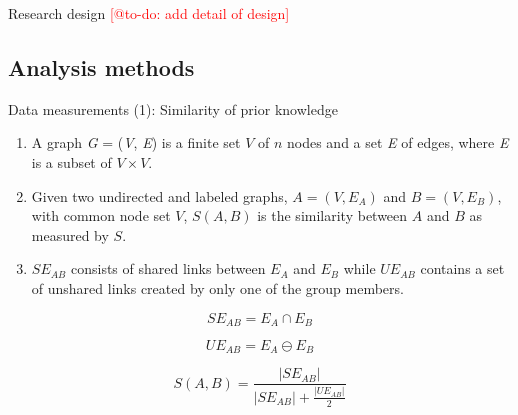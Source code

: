 \begin{frame}{Research design}
\textcolor<1>{red}{[@to-do: add detail of design]} 
\end{frame}


\subsection{Analysis methods}
\begin{frame}[allowframebreaks]{Data measurements (1): Similarity of prior knowledge}
    \begin{enumerate}
        \item A graph \textit{G} = (\textit{V}, \textit{E}) is a finite set $V$ 
        of $n$ nodes and a set \textit{E} of edges, where \textit{E} is a 
        subset of $V \times V$.
        \item Given two undirected and labeled graphs, $A = (V, E_A)$ and 
        $B = (V, E_B)$, with common node set $V$, $S(A, B)$ is the similarity 
        between $A$ and $B$ as measured by $S$. 
        \item $SE_{AB}$ consists of shared links between $E_A$ and $E_B$ 
        while $UE_{AB}$ contains a set of unshared links created by 
        only one of the group members.
    \end{enumerate}
     
    \begin{equation}
      SE_{AB} = E_A \cap E_B \label{eq:1}
    \end{equation}
    
    \begin{equation}
      UE_{AB} = E_A \ominus E_B \label{eq:2}
    \end{equation}
    
    \begin{equation}
      S(A, B) = \frac{|SE_{AB}|}{{|SE_{AB}| + \frac{|UE_{AB}|}{2}}} \label{eq:3}
    \end{equation}
    

\end{frame}
